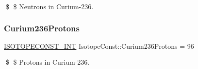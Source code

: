 \$ \$ Neutrons in Curium-\/236. \mbox{\label{group___isotope_const-_curium-_cm236_ga9ec6701ef1a961336d57ca43443821a0}} 
\subsubsection{\texorpdfstring{Curium236\+Protons}{Curium236Protons}}
{\footnotesize\ttfamily \mbox{\hyperlink{group___isotope_const-_macros_ga5f18360b3e99483a35c32d789e62621c}{I\+S\+O\+T\+O\+P\+E\+C\+O\+N\+S\+T\+\_\+\+I\+NT}} Isotope\+Const\+::\+Curium236\+Protons = 96}

\$ \$ Protons in Curium-\/236. 